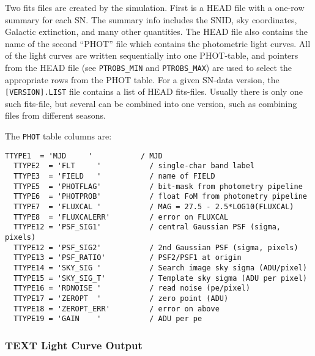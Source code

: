 \documentclass[12pt]{article}
\begin{document}
Two fits files are created by the simulation.
First is a HEAD file with a one-row summary for each SN.
The summary info includes the SNID, sky coordinates,
Galactic extinction, and many other quantities.
The HEAD file also contains the name of the second 
``PHOT'' file which contains the photometric light curves.
All of the light curves are written sequentially into one
PHOT-table, and pointers from the HEAD file 
(see {\tt PTROBS\_MIN} and {\tt PTROBS\_MAX}) 
are used to select the appropriate rows from the PHOT table.
For a given SN-data version, the {\tt [VERSION].LIST} file
contains a list of HEAD fits-files. Usually there is only
one such fits-file, but several can be combined into one version,
such as combining files from different seasons.

The  {\tt PHOT} table columns are:
\begin{Verbatim}[frame=single]
  TTYPE1  = 'MJD     '           / MJD
  TTYPE2  = 'FLT     '           / single-char band label
  TTYPE3  = 'FIELD   '           / name of FIELD
  TTYPE5  = 'PHOTFLAG'           / bit-mask from photometry pipeline
  TTYPE6  = 'PHOTPROB'           / float FoM from photometry pipeline
  TTYPE7  = 'FLUXCAL '           / MAG = 27.5 - 2.5*LOG10(FLUXCAL)
  TTYPE8  = 'FLUXCALERR'         / error on FLUXCAL  
  TTYPE12 = 'PSF_SIG1'           / central Gaussian PSF (sigma, pixels)
  TTYPE12 = 'PSF_SIG2'           / 2nd Gaussian PSF (sigma, pixels)
  TTYPE13 = 'PSF_RATIO'          / PSF2/PSF1 at origin
  TTYPE14 = 'SKY_SIG '           / Search image sky sigma (ADU/pixel) 
  TTYPE15 = 'SKY_SIG_T'          / Template sky sigma (ADU per pixel)
  TTYPE16 = 'RDNOISE '           / read noise (pe/pixel)
  TTYPE17 = 'ZEROPT  '           / zero point (ADU)
  TTYPE18 = 'ZEROPT_ERR'         / error on above
  TTYPE19 = 'GAIN    '           / ADU per pe
\end{Verbatim}


   \subsubsection{TEXT Light Curve Output }
   \label{sss:text_format}
\end{document}
